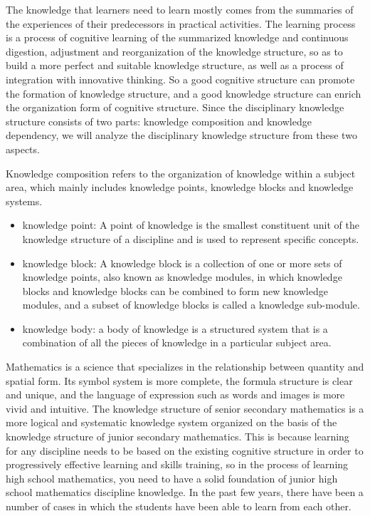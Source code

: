 The knowledge that learners need to learn mostly comes from the summaries of the experiences of their predecessors in practical activities. The learning process is a process of cognitive learning of the summarized knowledge and continuous digestion, adjustment and reorganization of the knowledge structure, so as to build a more perfect and suitable knowledge structure, as well as a process of integration with innovative thinking. So a good cognitive structure can promote the formation of knowledge structure, and a good knowledge structure can enrich the organization form of cognitive structure. Since the disciplinary knowledge structure consists of two parts: knowledge composition and knowledge dependency, we will analyze the disciplinary knowledge structure from these two aspects.

Knowledge composition refers to the organization of knowledge within a subject area, which mainly includes knowledge points, knowledge blocks and knowledge systems.
\begin{itemize}
	\item knowledge point: A point of knowledge is the smallest constituent unit of the knowledge structure of a discipline and is used to represent specific concepts.
	\item knowledge block: A knowledge block is a collection of one or more sets of knowledge points, also known as knowledge modules, in which knowledge blocks and knowledge blocks can be combined to form new knowledge modules, and a subset of knowledge blocks is called a knowledge sub-module.
	\item knowledge body: a body of knowledge is a structured system that is a combination of all the pieces of knowledge in a particular subject area.
\end{itemize}


Mathematics is a science that specializes in the relationship between quantity and spatial form\cite{he2017learning}. Its symbol system is more complete, the formula structure is clear and unique, and the language of expression such as words and images is more vivid and intuitive. The knowledge structure of senior secondary mathematics is a more logical and systematic knowledge system organized on the basis of the knowledge structure of junior secondary mathematics. This is because learning for any discipline needs to be based on the existing cognitive structure in order to progressively effective learning and skills training, so in the process of learning high school mathematics, you need to have a solid foundation of junior high school mathematics discipline knowledge. In the past few years, there have been a number of cases in which the students have been able to learn from each other.


